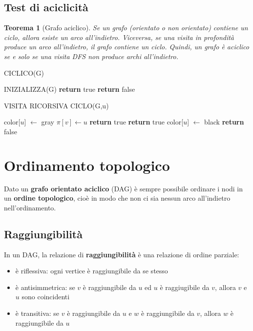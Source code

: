 \documentclass[11pt]{article}
\newtheorem*{theorem}{Teorema}
\theoremstyle{proprietà}
\begin{document}
\subsection{Test di aciclicità}
\begin{theorem}[Grafo aciclico]
    Se un grafo (orientato o non orientato) contiene un ciclo, allora esiste un arco all'indietro. Viceversa, se una visita 
    in profondità produce un arco all'indietro, il grafo contiene un ciclo. Quindi, un grafo è aciclico se e solo se una 
    visita DFS non produce archi all'indietro.
\end{theorem} 
\begin{algorithm}[H]
    \caption{CICLICO(G)}
    \begin{algorithmic}
        \State INIZIALIZZA(G)
                \State \textbf{return} true
            \EndIf 
        \EndFor
        \State \textbf{return} false
    \end{algorithmic}
\end{algorithm}
\begin{algorithm}[H]
    \caption{VISITA RICORSIVA CICLO(G,u)}
    \begin{algorithmic}
        \State color[$u$] $\gets$ gray
                \State $\pi[v] \gets u$
                    \State \textbf{return} true
                \EndIf
                    \State \textbf{return} true
            \EndIf 
        \EndFor 
        \State color[$u$] $\gets$ black 
        \State \textbf{return} false
    \end{algorithmic}
\end{algorithm}
\section{Ordinamento topologico}
Dato un \textbf{grafo orientato aciclico} (DAG) è sempre possibile ordinare i nodi in un \textbf{ordine topologico}, cioè 
in modo che non ci sia nessun arco all'indietro nell'ordinamento.
\subsection{Raggiungibilità}
In un DAG, la relazione di \textbf{raggiungibilità} è una relazione di ordine parziale:
\begin{itemize}
    \item è riflessiva: ogni vertice è raggiungibile da se stesso 
    \item è antisimmetrica: se $v$ è raggiungibile da $u$ ed $u$ è raggiugibile da $v$, allora $v$ e $u$ sono coincidenti
    \item è transitiva: se $v$ è raggiungibile da $u$ e $w$ è raggiungibile da $v$, allora $w$ è raggiungibile da $u$
\end{itemize}
\end{document}

